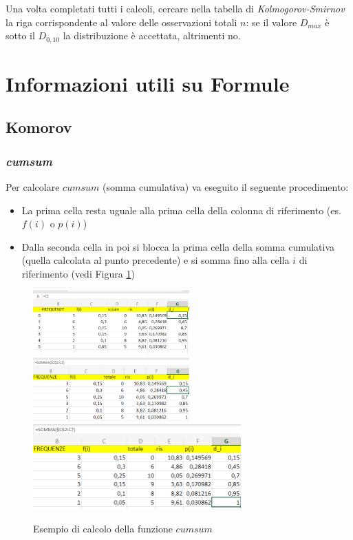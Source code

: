 Una volta completati tutti i calcoli, cercare nella tabella di
\textit{Kolmogorov-Smirnov} la riga corrispondente al valore delle osservazioni
totali $n$: se il valore $D_{max}$ è sotto il $D_{0,10}$ la distribuzione è
accettata, altrimenti no.

\section{Informazioni utili su Formule}

\subsection{Komorov}

\subsubsection{\textit{cumsum}}

Per calcolare $cumsum$ (somma cumulativa) va eseguito il seguente procedimento:
\begin{itemize}
    \item La prima cella resta uguale alla prima cella della colonna di
          riferimento (es. $f(i)$ o $p(i)$)
    \item Dalla seconda cella in poi si blocca la prima cella della somma
          cumulativa (quella calcolata al punto precedente) e si somma fino alla
          cella $i$ di riferimento (vedi Figura \ref{cumsum})
\end{itemize}

\begin{figure}[H]
    \centering
    \includegraphics[width=6cm, keepaspectratio]{capitoli/goodnes_of_fit/imgs/cumsum1.png}
    \includegraphics[width=6cm, keepaspectratio]{capitoli/goodnes_of_fit/imgs/cumsum2.png}
    \includegraphics[width=8cm, keepaspectratio]{capitoli/goodnes_of_fit/imgs/cumsum3.png}
    \caption{Esempio di calcolo della funzione $cumsum$}
    \label{cumsum}
\end{figure}